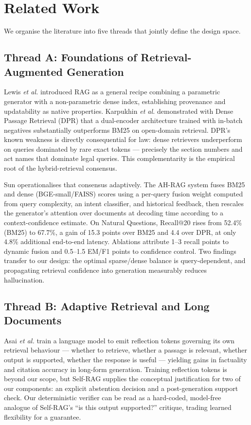 \documentclass[conference]{IEEEtran}
\begin{document}
\section{Related Work}
\label{sec:related}

We organise the literature into five threads that jointly define the design space.

\subsection{Thread A: Foundations of Retrieval-Augmented Generation}

Lewis \textit{et al.} \cite{lewis2020} introduced RAG as a general recipe combining a parametric generator with a non-parametric dense index, establishing provenance and updatability as native properties. Karpukhin \textit{et al.} \cite{karpukhin2020} demonstrated with Dense Passage Retrieval (DPR) that a dual-encoder architecture trained with in-batch negatives substantially outperforms BM25 on open-domain retrieval. DPR's known weakness is directly consequential for law: dense retrievers underperform on queries dominated by rare exact tokens — precisely the section numbers and act names that dominate legal queries. This complementarity is the empirical root of the hybrid-retrieval consensus.

Sun \cite{sun2025} operationalises that consensus adaptively. The AH-RAG system fuses BM25 and dense (BGE-small/FAISS) scores using a per-query fusion weight computed from query complexity, an intent classifier, and historical feedback, then rescales the generator's attention over documents at decoding time according to a context-confidence estimate. On Natural Questions, Recall@20 rises from 52.4\% (BM25) to 67.7\%, a gain of 15.3 points over BM25 and 4.4 over DPR, at only 4.8\% additional end-to-end latency. Ablations attribute 1--3 recall points to dynamic fusion and 0.5--1.5 EM/F1 points to confidence control. Two findings transfer to our design: the optimal sparse/dense balance is query-dependent, and propagating retrieval confidence into generation measurably reduces hallucination.

\subsection{Thread B: Adaptive Retrieval and Long Documents}

Asai \textit{et al.} \cite{asai2023} train a language model to emit reflection tokens governing its own retrieval behaviour — whether to retrieve, whether a passage is relevant, whether output is supported, whether the response is useful — yielding gains in factuality and citation accuracy in long-form generation. Training reflection tokens is beyond our scope, but Self-RAG supplies the conceptual justification for two of our components: an explicit abstention decision and a post-generation support check. Our deterministic verifier can be read as a hard-coded, model-free analogue of Self-RAG's ``is this output supported?'' critique, trading learned flexibility for a guarantee.
\end{document}
